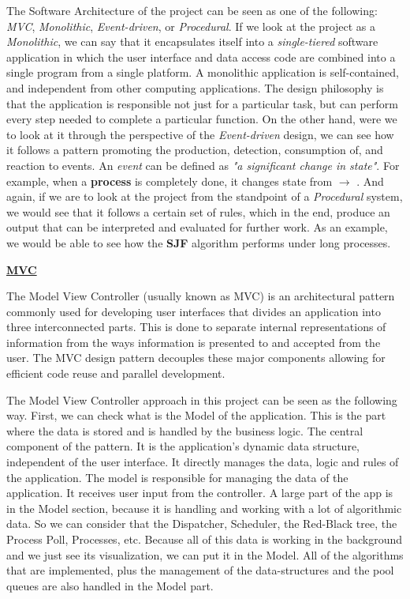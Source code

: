 \documentclass{article}
\newcommand{\code}[1]{\codeinline{\texttt{#1}}}
\begin{document}
The Software Architecture of the project can be seen as one of the following: \textit{MVC}, \textit{Monolithic}, \textit{Event-driven}, or \textit{Procedural}. If we look at the project as a \textit{Monolithic}, we can say that it encapsulates itself into a \textit{single-tiered} software application in which the user interface and data access code are combined into a single program from a single platform. A monolithic application is self-contained, and independent from other computing applications. The design philosophy is that the application is responsible not just for a particular task, but can perform every step needed to complete a particular function. On the other hand, were we to look at it through the perspective of the \textit{Event-driven} design, we can see how it follows a pattern promoting the production, detection, consumption of, and reaction to events. An \textit{event} can be defined as \textit{"a significant change in state"}. For example, when a \textbf{process} \code{ttl} is completely done, it changes state from \code{RUNNING} $\rightarrow$ \code{DONE}. And again, if we are to look at the project from the standpoint of a \textit{Procedural} system, we would see that it follows a certain set of rules, which in the end, produce an output that can be interpreted and evaluated for further work. As an example, we would be able to see how the \textbf{SJF} algorithm performs under long processes.

\bigskip

\textbf{\underline{MVC}}

The Model View Controller (usually known as MVC) is an architectural pattern commonly used for developing user interfaces that divides an application into three interconnected parts. This is done to separate internal representations of information from the ways information is presented to and accepted from the user. The MVC design pattern decouples these major components allowing for efficient code reuse and parallel development.

The Model View Controller approach in this project can be seen as the following way. First, we can check what is the Model of the application. This is the part where the data is stored and is handled by the business logic. The central component of the pattern. It is the application's dynamic data structure, independent of the user interface. It directly manages the data, logic and rules of the application. The model is responsible for managing the data of the application. It receives user input from the controller. A large part of the app is in the Model section, because it is handling and working with a lot of algorithmic data. So we can consider that the Dispatcher, Scheduler, the Red-Black tree, the Process Poll, Processes, etc. Because all of this data is working in the background and we just see its visualization, we can put it in the Model. All of the algorithms that are implemented, plus the management of the data-structures and the pool queues are also handled in the Model part.
\end{document}
